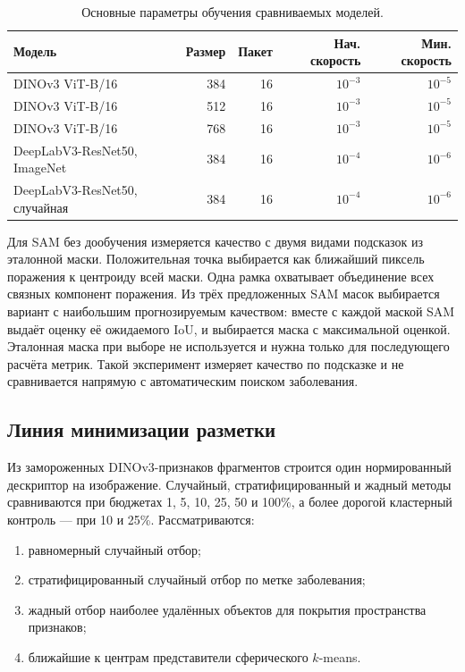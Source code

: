 \documentclass[a4paper,12pt]{extarticle}
\begin{document}
\begin{table}[ht]
  \caption{Основные параметры обучения сравниваемых моделей.}
  \label{tab:training-settings}
  \centering
  \footnotesize
  \begin{tabular}{lrrrr}
    \toprule
    Модель & Размер & Пакет & Нач. скорость & Мин. скорость \\
    \midrule
    DINOv3 ViT-B/16 & 384 & 16 & $10^{-3}$ & $10^{-5}$ \\
    DINOv3 ViT-B/16 & 512 & 16 & $10^{-3}$ & $10^{-5}$ \\
    DINOv3 ViT-B/16 & 768 & 16 & $10^{-3}$ & $10^{-5}$ \\
    DeepLabV3-ResNet50, ImageNet & 384 & 16 & $10^{-4}$ & $10^{-6}$ \\
    DeepLabV3-ResNet50, случайная & 384 & 16 & $10^{-4}$ & $10^{-6}$ \\
    \bottomrule
  \end{tabular}
\end{table}

Для SAM без дообучения измеряется качество с двумя видами подсказок из
эталонной маски. Положительная точка выбирается как ближайший пиксель поражения
к центроиду всей маски. Одна рамка охватывает объединение всех связных
компонент поражения. Из трёх предложенных SAM масок выбирается вариант с
наибольшим прогнозируемым качеством: вместе с каждой маской SAM выдаёт оценку
её ожидаемого IoU, и выбирается маска с максимальной оценкой. Эталонная маска
при выборе не используется и нужна только для последующего расчёта метрик.
Такой эксперимент измеряет качество по подсказке и не сравнивается напрямую с
автоматическим поиском заболевания.

\subsection{Линия минимизации разметки}

Из замороженных DINOv3-признаков фрагментов строится один нормированный дескриптор на
изображение. Случайный, стратифицированный и жадный методы сравниваются при
бюджетах 1, 5, 10, 25, 50 и 100\%, а более дорогой кластерный контроль --- при
10 и 25\%. Рассматриваются:

\begin{enumerate}
  \item равномерный случайный отбор;
  \item стратифицированный случайный отбор по метке заболевания;
  \item жадный отбор наиболее удалённых объектов для покрытия пространства
  признаков;
  \item ближайшие к центрам представители сферического $k$-means.
\end{enumerate}
\end{document}
